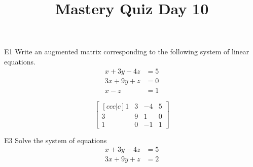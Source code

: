 \documentclass{sbgLAquiz}
\title{Mastery Quiz Day 10 }
\begin{document}
\begin{problem}{E1}
Write an augmented matrix corresponding to the following system of linear equations.
\begin{align*}
x+3y-4z &= 5 \\
3x+9y+z &= 0 \\
x-z &= 1
\end{align*}
\end{problem}
\begin{solution}
$$\begin{bmatrix}[ccc|c]
1 & 3 & -4 & 5 \\
3 & 9 & 1 & 0 \\
1 & 0 & -1 & 1 
\end{bmatrix}$$
\end{solution}

\begin{problem}{E3}
Solve the system of equations
\begin{align*}
x+3y-4z &= 5 \\
3x+9y+z &= 2
\end{align*}
\end{problem}
\end{document}

